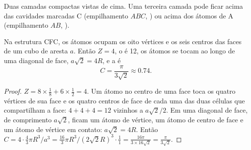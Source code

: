 \begin{omfigure}

{\small Duas camadas compactas vistas de cima. Uma terceira camada pode
ficar acima das cavidades marcadas C (empilhamento $ABC$, ) ou acima dos átomos de A (empilhamento $AB$, ).}
\end{omfigure}

\begin{proposition}\label{prop:b1:crystals-metals:fcc}
Na estrutura CFC, os átomos ocupam os oito vértices e os seis centros
das faces de um cubo de aresta $a$. Então $Z = 4$, o  é 12, os átomos se tocam ao longo de uma diagonal de face,
$a\sqrt2 = 4R$, e a  é
\[
  C = \frac{\pi}{3\sqrt2} \approx 0.74 .
\]
\end{proposition}

\begin{proof}
$Z = 8 \times \frac18 + 6 \times \frac12 = 4$. Um átomo no centro de uma
face toca os quatro vértices de sua face e os quatro centros de face de
cada uma das duas células que compartilham a face: $4 + 4 + 4 = 12$
vizinhos a $a\sqrt2/2$. Em uma diagonal de face, de comprimento $a\sqrt2$,
ficam um átomo de vértice, um átomo de centro de face e um átomo de
vértice em contato: $a\sqrt2 = 4R$. Então
$C = 4 \cdot \frac43\pi R^3/a^3 = \frac{16}{3}\pi R^3/(2\sqrt2 R)^3 \cdot
\frac{1}{1} = \frac{16\pi}{3 \times 16\sqrt2} = \frac{\pi}{3\sqrt2}$.
\end{proof}

